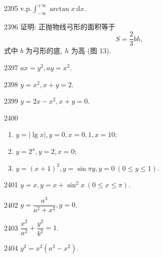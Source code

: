 \begin{prob}[S]{2395}
$\mathrm{v.p.} \displaystyle\int_{-\infty}^{+\infty} \arctan x\,\mathrm{d}x$.
\end{prob}


\begin{prob}[M]{2396}
证明: 正抛物线弓形的面积等于
\[
S = \frac{2}{3} bh,
\]
式中 $b$ 为弓形的底, $h$ 为高 (图 13).
\end{prob}


\begin{prob}[S]{2397}
$ax = y^2, ay = x^2$.
\end{prob}

\begin{prob}[S]{2398}
$y = x^2, x + y = 2$.
\end{prob}

\begin{prob}[S]{2399}
$y = 2x - x^2, x + y = 0$.
\end{prob}

\begin{prob}[L]{2400}
\begin{enumerate}[label=(\alph*), itemsep=2pt, topsep=3pt]
\item $y = |\lg x|, y = 0, x = 0, 1, x = 10$;
\item $y = 2^x, y = 2, x = 0$;
\item $y = (x + 1)^2, y = \sin \pi y, y = 0\ (0 \leqslant y \leqslant 1)$.
\end{enumerate}
\end{prob}

\begin{prob}[S]{2401}
$y = x, y = x + \sin^2 x\ (0 \leqslant x \leqslant \pi)$.
\end{prob}

\begin{prob}[S]{2402}
$y = \dfrac{a^3}{a^2 + x^2}, y = 0$.
\end{prob}

\begin{prob}[S]{2403}
$\dfrac{x^2}{a^2} + \dfrac{y^2}{b^2} = 1$.
\end{prob}

\begin{prob}[S]{2404}
$y^2 = x^2(a^2 - x^2)$.
\end{prob}

